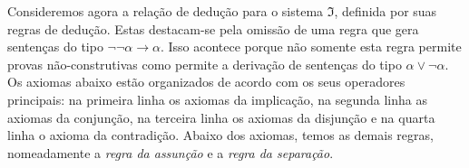 \vspace{0.5\baselineskip}
Consideremos agora a relação de dedução para o sistema $\mathfrak{I}$, definida por suas regras de dedução.
Estas destacam-se pela omissão de uma regra que gera sentenças do tipo $\neg\neg\alpha\to\alpha$.
Isso acontece porque não somente esta regra permite provas não-construtivas como permite a derivação de sentenças do tipo $\alpha\vee\neg\alpha$.
Os axiomas abaixo estão organizados de acordo com os seus operadores principais: na primeira linha os axiomas da implicação, na segunda linha as axiomas da conjunção, na terceira linha os axiomas da disjunção e na quarta linha o axioma da contradição.
Abaixo dos axiomas, temos as demais regras, nomeadamente a \emph{regra da assunção} e a \emph{regra da separação}.

\vspace{0.5\baselineskip}

